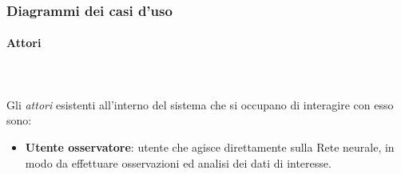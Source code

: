 \subsubsection{Diagrammi dei casi d'uso}
\label{casi d'uso}
\paragraph{Attori}\mbox{}\\\\
\label{Attori}
Gli \textit{attori} esistenti all'interno del sistema che si occupano di interagire con esso sono:
\begin{itemize}
\item \textbf{Utente osservatore}: utente che agisce  direttamente sulla Rete neurale, in modo da effettuare osservazioni ed analisi dei dati di interesse.
\end{itemize}


